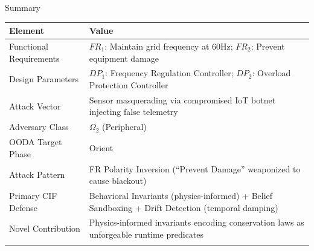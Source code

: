\documentclass[
  ignorenonframetext,
]{beamer}
\newcounter{none} %
\begin{document}
\begin{frame}[allowframebreaks]{Summary}
\protect{}\label{summary}
{\def\LTcaptype{none} %
\begin{longtable}[]{@{}
  >{\raggedright\arraybackslash}p{}
  >{\raggedright\arraybackslash}p{}@{}}
\toprule\noalign{}
\begin{minipage}[b]{\linewidth}\raggedright
Element
\end{minipage} & \begin{minipage}[b]{\linewidth}\raggedright
Value
\end{minipage} \\
\midrule\noalign{}
\endhead
Functional Requirements & \(FR_1\): Maintain grid frequency at 60Hz;
\(FR_2\): Prevent equipment damage \\
Design Parameters & \(DP_1\): Frequency Regulation Controller; \(DP_2\):
Overload Protection Controller \\
Attack Vector & Sensor masquerading via compromised IoT botnet injecting
false telemetry \\
Adversary Class & \(\Omega_2\) (Peripheral) \\
OODA Target Phase & Orient \\
Attack Pattern & FR Polarity Inversion (``Prevent Damage'' weaponized to
cause blackout) \\
Primary CIF Defense & Behavioral Invariants (physics-informed) + Belief
Sandboxing + Drift Detection (temporal damping) \\
Novel Contribution & Physics-informed invariants encoding conservation
laws as unforgeable runtime predicates \\
\bottomrule\noalign{}
\end{longtable}
}
\end{frame}
\end{document}
